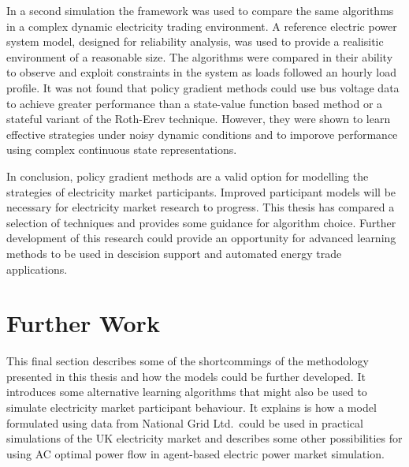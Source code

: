 In a second simulation the framework was used to compare the same algorithms in
a complex dynamic electricity trading environment.  A reference electric power
system model, designed for reliability analysis, was used to provide a
realisitic environment of a reasonable size.  The algorithms were compared in
their ability to observe and exploit constraints in the system as loads followed
an hourly load profile.  It was not found that policy gradient methods could use
bus voltage data to achieve greater performance than a state-value function
based method or a stateful variant of the Roth-Erev technique.  However, they
were shown to learn effective strategies under noisy dynamic conditions and to
imporove performance using complex continuous state representations.

In conclusion, policy gradient methods are a valid option for modelling
the strategies of electricity market participants.  Improved participant models
will be necessary for electricity market research to progress.  This thesis has
compared a selection of techniques and provides some guidance for algorithm
choice.
Further development of this research could provide an opportunity for advanced
learning methods to be used in descision support and automated energy trade
applications.

\section{Further Work}
\label{sec:furtherwork}
This final section describes some of the shortcommings of the methodology
presented in this thesis and how the models could be further developed.  It
introduces some alternative learning algorithms that might also be used to
simulate electricity market participant behaviour.
It explains is how a model formulated using data from National Grid
Ltd.~could be used in practical simulations of the UK electricity market and
describes some other possibilities for using AC optimal power flow in
agent-based electric power market simulation.

